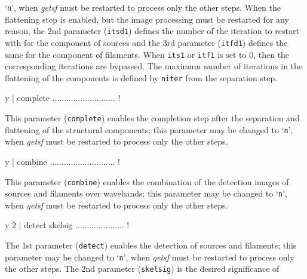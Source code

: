 \documentclass[a4paper,10pt]{article}
\begin{document}
`\verb!n!', when \textsl{getsf} must be restarted to process only the other steps. When the flattening step is enabled, but the
image processing must be restarted for any reason, the 2nd parameter (\verb!itsd1!) defines the number of the iteration to restart
with for the component of sources and the 3rd parameter (\verb!itfd1!) defines the same for the component of filaments. When
\verb!its1! or \verb!itf1! is set to 0, then the corresponding iterations are bypassed. The maximum number of iterations in the
flattening of the components is defined by \verb!niter! from the separation step.
\begin{verbnobox}[\mbox{}\small]
 y                   | complete ........................... !
\end{verbnobox}
This parameter (\verb!complete!) enables the completion step after the separation and flattening of the structural components; this
parameter may be changed to `\verb!n!', when \textsl{getsf} must be restarted to process only the other steps.
\begin{verbnobox}[\mbox{}\small]
 y                   | combine ............................ !
\end{verbnobox}
This parameter (\verb!combine!) enables the combination of the detection images of sources and filaments over wavebands; this
parameter may be changed to `\verb!n!', when \textsl{getsf} must be restarted to process only the other steps.
\begin{verbnobox}[\mbox{}\small]
 y 2                 | detect skelsig ..................... !
\end{verbnobox}
The 1st parameter (\verb!detect!) enables the detection of sources and filaments; this parameter may be changed to `\verb!n!', when
\textsl{getsf} must be restarted to process only the other steps. The 2nd parameter (\verb!skelsig!) is the desired significance of
\end{document}
